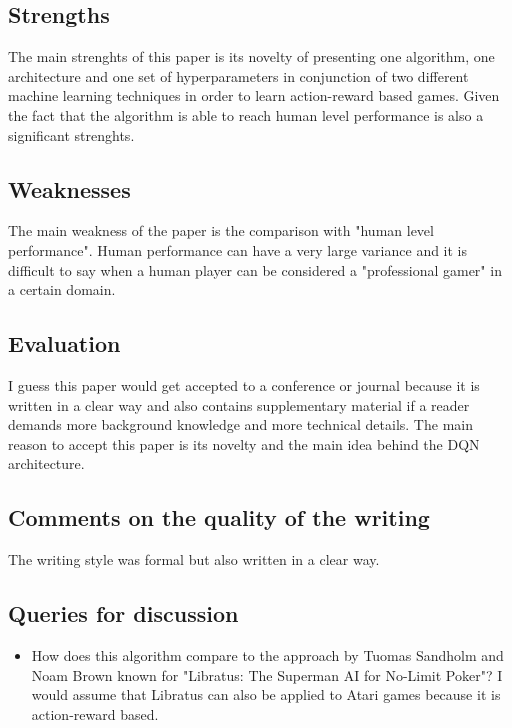 \documentclass[a4paper]{article}
\begin{document}
\subsection{Strengths}

The main strenghts of this paper is its novelty of presenting one algorithm, one architecture and one set of hyperparameters in conjunction of two different machine learning techniques in order to learn action-reward based games. Given the fact that the algorithm is able to reach human level performance is also a significant strenghts.

\subsection{Weaknesses}

The main weakness of the paper is the comparison with "human level performance". Human performance can have a very large variance and it is difficult to say when a human player can be considered a "professional gamer" in a certain domain.

\subsection{Evaluation}

I guess this paper would get accepted to a conference or journal because it is written in a clear way and also contains supplementary material if a reader demands more background knowledge and more technical details. The main reason to accept this paper is its novelty and the main idea behind the DQN architecture.

\subsection{Comments on the quality of the writing}

The writing style was formal but also written in a clear way. 

\subsection{Queries for discussion}

\begin{itemize}
	\item How does this algorithm compare to the approach by Tuomas Sandholm and Noam Brown known for "Libratus: The Superman AI for No-Limit Poker"? I would assume that Libratus can also be applied to Atari games because it is action-reward based.
\end{itemize}
\end{document}

